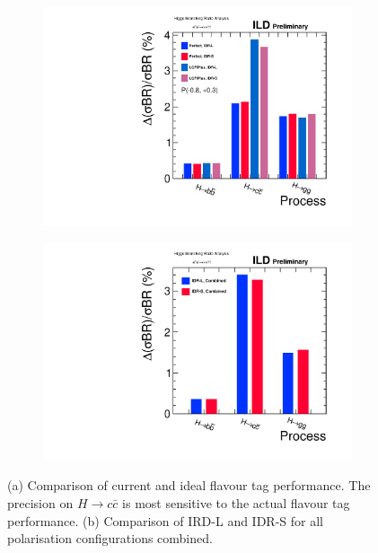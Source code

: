 \begin{figure}[htbp]
\begin{subfigure}{0.49\hsize} 
 \includegraphics[width=\textwidth]{Performance/fig/IDRplot1.pdf}
 \caption{ \label{fig:Hbbccgg:BR:cheat}}
 \end{subfigure}
\begin{subfigure}{0.49\hsize} 
 \includegraphics[width=\textwidth]{Performance/fig/IDRplot3.pdf}
 \caption{  \label{fig:Hbbccgg:BR:LS}}
 \end{subfigure}
\caption{
(a) Comparison of current and ideal flavour tag performance. The precision on $H \to c\bar{c}$ is most sensitive to the actual flavour tag performance.
(b) Comparison of IRD-L and IDR-S for all polarisation configurations combined.
}
\label{fig:Hbbccgg:BR}
\end{figure}

